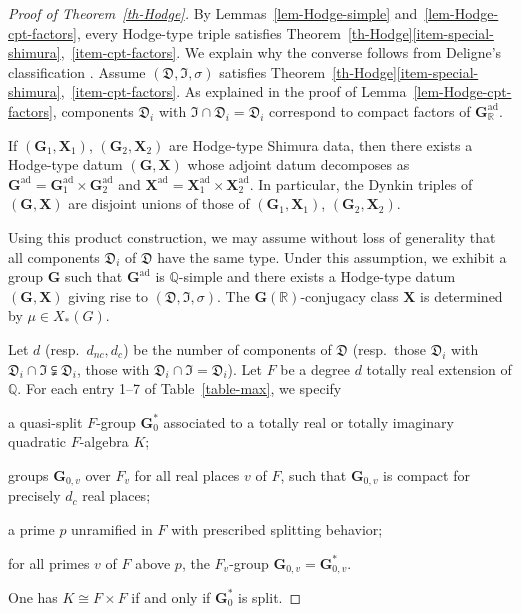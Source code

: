 \documentclass[11pt]{amsart}
\numberwithin{equation}{section}
\theoremstyle{definition}
\theoremstyle{remark}
\newcommand{\Dfr}{{\mathfrak D}}
\newcommand{\Ifr}{{\mathfrak I}}
\newcommand{\QQ}{\mathbb{Q}}
\newcommand{\RR}{\mathbb{R}}
\DeclareMathOperator{\ad}{ad}
\newcommand{\gx}{(\mathbf G, \mathbf X)}
\begin{document}
\begin{proof}[Proof of Theorem~\ref{th-Hodge}]
  By Lemmas~\ref{lem-Hodge-simple} and~\ref{lem-Hodge-cpt-factors}, every Hodge-type triple satisfies Theorem~\ref{th-Hodge}\eqref{item-special-shimura},~\eqref{item-cpt-factors}. 
  We explain why the converse follows from Deligne's classification \cite[Sections~2.3.4, 2.3.5, 2.3.7 and 2.3.9, Propositions~2.3.6 and~2.3.10, and Table~2.3.8]{Deligne-Shimura-varieties}. Assume $(\Dfr, \Ifr, \sigma)$ satisfies Theorem~\ref{th-Hodge}\eqref{item-special-shimura},~\eqref{item-cpt-factors}. As explained in the proof of Lemma~\ref{lem-Hodge-cpt-factors}, components $\Dfr_i$ with $\Ifr \cap \Dfr_i=\Dfr_i$ correspond to compact factors of $\mathbf{G}_{\RR}^{\ad}$.

If $(\mathbf{G}_1, \mathbf{X}_1)$, $(\mathbf{G}_2, \mathbf{X}_2)$ are Hodge-type Shimura data, then there exists a Hodge-type datum $\gx$ whose adjoint datum decomposes as $\mathbf{G}^{\ad}=\mathbf{G}_1^{\ad} \times \mathbf{G}_2^{\ad}$ and $\mathbf{X}^{\ad}=\mathbf{X}^{\ad}_1 \times \mathbf{X}_2^{\ad}$. 
In particular, the Dynkin triples of $\gx$ are disjoint unions of those of $(\mathbf{G}_1, \mathbf{X}_1)$, $(\mathbf{G}_2, \mathbf{X}_2)$.

Using this product construction, we may assume without loss of generality that all components $\Dfr_i$ of $\Dfr$ have the same type. Under this assumption, we exhibit a group $\mathbf{G}$ such that $\mathbf{G}^{\ad}$ is $\QQ$-simple and there exists a Hodge-type datum $\gx$ giving rise to $(\Dfr, \Ifr, \sigma)$. The $\mathbf{G}(\RR)$-conjugacy class $\mathbf{X}$ is determined by $\mu \in X_*(G)$. 

Let $d$ (resp.\ $d_{nc}, d_c$) be the number of components  of $\Dfr$ (resp.\ those $\Dfr_i$ with $\Dfr_i \cap \Ifr \subsetneqq \Dfr_i$, those with $\Dfr_i \cap \Ifr=\Dfr_i$). Let $F$ be a degree $d$ totally real extension of $\QQ$.
For each entry 1--7 of Table~\ref{table-max},  we specify 
\begin{alist}
\item a quasi-split $F$-group $\mathbf{G}_0^*$ associated to a totally real or totally imaginary quadratic $F$-algebra $K$; 

\item groups $\mathbf{G}_{0,v}$ over $F_v$ for all real places $v$ of $F$, such that $\mathbf{G}_{0,v}$ is compact for precisely $d_c$ real places;  
\item a prime $p$ unramified in $F$ with prescribed splitting behavior;
\item
\label{item-local-quasi-split}
for all primes $v$ of $F$ above $p$, the $F_v$-group $\mathbf{G}_{0,v}=\mathbf{G}_{0,v}^*$.
\end{alist}
One has $K \cong F \times F$ if and only if $\mathbf{G}_0^*$ is split.


\end{proof}
\end{document}
